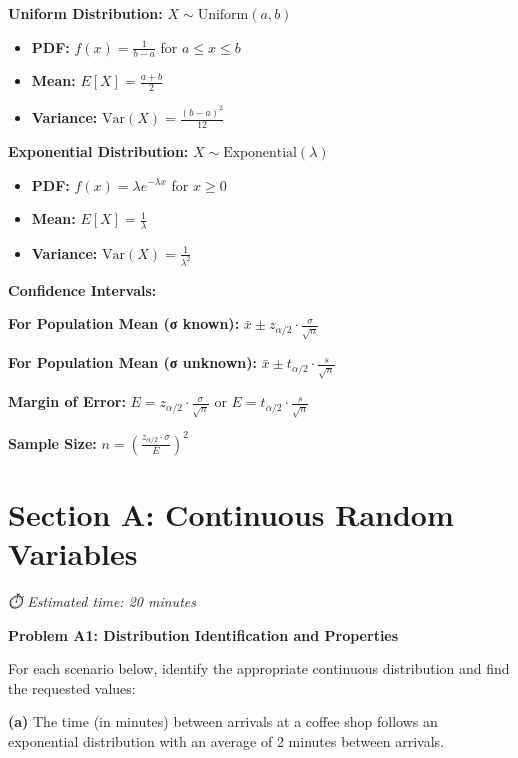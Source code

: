 \documentclass[
  11pt,
]{article}
\providecommand{\tightlist}{%
  \setlength{\itemsep}{0pt}\setlength{\parskip}{0pt}}\usepackage{longtable,booktabs,array}
\begin{document}
\textbf{Uniform Distribution:} \(X \sim \text{Uniform}(a,b)\)

\begin{itemize}
\tightlist
\item
  \textbf{PDF:} \(f(x) = \frac{1}{b-a}\) for \(a \leq x \leq b\)
\item
  \textbf{Mean:} \(E[X] = \frac{a+b}{2}\)
\item
  \textbf{Variance:} \(\text{Var}(X) = \frac{(b-a)^2}{12}\)
\end{itemize}

\textbf{Exponential Distribution:}
\(X \sim \text{Exponential}(\lambda)\)

\begin{itemize}
\tightlist
\item
  \textbf{PDF:} \(f(x) = \lambda e^{-\lambda x}\) for \(x \geq 0\)
\item
  \textbf{Mean:} \(E[X] = \frac{1}{\lambda}\)
\item
  \textbf{Variance:} \(\text{Var}(X) = \frac{1}{\lambda^2}\)
\end{itemize}

\textbf{Confidence Intervals:}

\textbf{For Population Mean (σ known):}
\(\bar{x} \pm z_{\alpha/2} \cdot \frac{\sigma}{\sqrt{n}}\)

\textbf{For Population Mean (σ unknown):}
\(\bar{x} \pm t_{\alpha/2} \cdot \frac{s}{\sqrt{n}}\)

\textbf{Margin of Error:}
\(E = z_{\alpha/2} \cdot \frac{\sigma}{\sqrt{n}}\) or
\(E = t_{\alpha/2} \cdot \frac{s}{\sqrt{n}}\)

\textbf{Sample Size:}
\(n = \left(\frac{z_{\alpha/2} \cdot \sigma}{E}\right)^2\)

\section{Section A: Continuous Random
Variables}\label{section-a-continuous-random-variables}

\emph{⏱️ Estimated time: 20 minutes}

\textbf{Problem A1: Distribution Identification and Properties}

For each scenario below, identify the appropriate continuous
distribution and find the requested values:

\textbf{(a)} The time (in minutes) between arrivals at a coffee shop
follows an exponential distribution with an average of 2 minutes between
arrivals.
\end{document}
